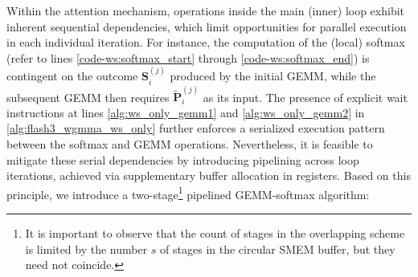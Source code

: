 Within the attention mechanism, operations inside the main (inner) loop exhibit inherent sequential dependencies, which limit opportunities for parallel execution in each individual iteration. For instance, the computation of the (local) softmax (refer to lines \ref{code-ws:softmax_start} through \ref{code-ws:softmax_end}) is contingent on the outcome $\mathbf{S}_i^{(j)}$ produced by the initial GEMM, while the subsequent GEMM then requires $\widetilde{\mathbf{P}}_i^{(j)}$ as its input. The presence of explicit wait instructions at lines \ref{alg:ws_only_gemm1} and \ref{alg:ws_only_gemm2} in \cref{alg:flash3_wgmma_ws_only} further enforces a serialized execution pattern between the softmax and GEMM operations. Nevertheless, it is feasible to mitigate these serial dependencies by introducing pipelining across loop iterations, achieved via supplementary buffer allocation in registers. Based on this principle, we introduce a two-stage\footnote{It is important to observe that the count of stages in the overlapping scheme is limited by the number $s$ of stages in the circular SMEM buffer, but they need not coincide.} pipelined GEMM-softmax algorithm:

